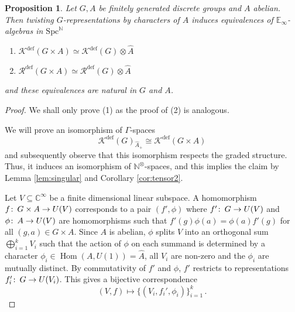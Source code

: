 \documentclass[oneside, a4paper, 12pt]{article}
\numberwithin{equation}{section}
\DeclareMathOperator{\Hom}{Hom}
\newcommand{\Kdef}{\mathcal{K}^{\mathrm{def}}}
\newcommand{\Rdef}{\mathcal{R}^{\mathrm{def}}}
\newcommand{\Spc}{\mathrm{Spc}}
\newcommand{\C}{\mathbb{C}}
\newcommand{\N}{\mathbb{N}}
\newcommand{\co}{\colon\thinspace}
\theoremstyle{plain}
\newtheorem{proposition}[theorem]{Proposition}
\theoremstyle{definition}
\theoremstyle{remark}
\begin{document}
\begin{proposition} \label{prop:key}
Let $G,A$ be finitely generated discrete groups and $A$ abelian. Then twisting $G$-representations by characters of $A$ induces equivalences of $\mathbb{E}_\infty$-algebras in $\Spc^\N$
\begin{enumerate}
\item[(1)] $\Kdef(G\times A)\simeq \Kdef(G) \otimes \widehat{A}$
\item[(2)] $\Rdef(G\times A)\simeq \Rdef(G) \otimes \widehat{A}$
\end{enumerate}
and these equivalences are natural in $G$ and $A$.
\end{proposition}
\begin{proof}
We shall only prove (1) as the proof of (2) is analogous.

We will prove an isomorphism of $\Gamma$-spaces
\[
\Kdef(G)_{\widehat{A}_+} \cong \Kdef(G\times A) 
\]
and subsequently observe that this isomorphism respects the graded structure. Thus, it induces an isomorphism of $\N^\otimes$-spaces, and this implies the claim by Lemma \ref{lem:singular} and Corollary \ref{cor:tensor2}.



Let $V\subseteq\C^\infty$ be a finite dimensional linear subspace. A homomorphism $f\co G\times A\to U(V)$ corresponds to a pair $(f',\phi)$ where $f'\co G\to U(V)$ and $\phi \co A\to U(V)$ are homomorphisms such that $f'(g)\phi(a)=\phi(a)f'(g)$ for all $(g,a)\in G\times A$. Since $A$ is abelian, $\phi$ splits $V$ into an orthogonal sum $\bigoplus_{i=1}^k V_i$ such that the action of $\phi$ on each summand is determined by a character $\phi_i\in \Hom(A,U(1))=\widehat{A}$, all $V_i$ are non-zero and the $\phi_i$ are mutually distinct. By commutativity of $f'$ and $\phi$, $f'$ restricts to representations $f_i'\co G\to U(V_i)$. This gives a bijective correspondence
\begin{equation} \label{eq:correspondence}
(V,f)\mapsto \{(V_i,f_i',\phi_i)\}_{i=1}^k\, .
\end{equation}






\end{proof}
\end{document}
